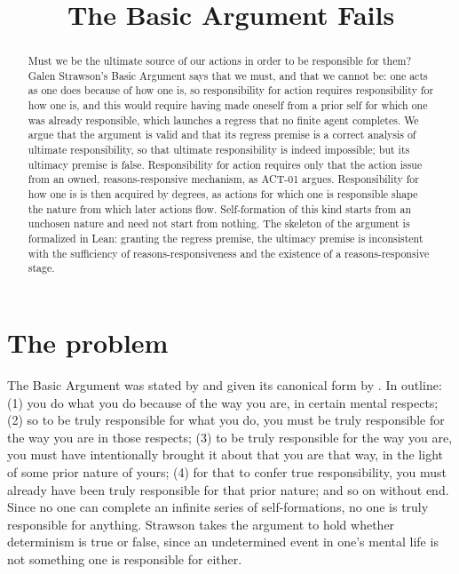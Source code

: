 \documentclass{situationist-preprint}
\title{The Basic Argument Fails}
\begin{document}
\maketitle

\begin{abstract}
Must we be the ultimate source of our actions in order to be responsible for them? Galen Strawson's Basic Argument says that we must, and that we cannot be: one acts as one does because of how one is, so responsibility for action requires responsibility for how one is, and this would require having made oneself from a prior self for which one was already responsible, which launches a regress that no finite agent completes. We argue that the argument is valid and that its regress premise is a correct analysis of ultimate responsibility, so that ultimate responsibility is indeed impossible; but its ultimacy premise is false. Responsibility for action requires only that the action issue from an owned, reasons-responsive mechanism, as ACT-01 argues. Responsibility for how one is is then acquired by degrees, as actions for which one is responsible shape the nature from which later actions flow. Self-formation of this kind starts from an unchosen nature and need not start from nothing. The skeleton of the argument is formalized in Lean: granting the regress premise, the ultimacy premise is inconsistent with the sufficiency of reasons-responsiveness and the existence of a reasons-responsive stage.
\end{abstract}

\section{The problem}

The Basic Argument was stated by \citet{Strawson1986} and given its canonical form by \citet{Strawson1994}. In outline: (1) you do what you do because of the way you are, in certain mental respects; (2) so to be truly responsible for what you do, you must be truly responsible for the way you are in those respects; (3) to be truly responsible for the way you are, you must have intentionally brought it about that you are that way, in the light of some prior nature of yours; (4) for that to confer true responsibility, you must already have been truly responsible for that prior nature; and so on without end. Since no one can complete an infinite series of self-formations, no one is truly responsible for anything. Strawson takes the argument to hold whether determinism is true or false, since an undetermined event in one's mental life is not something one is responsible for either.
\end{document}
